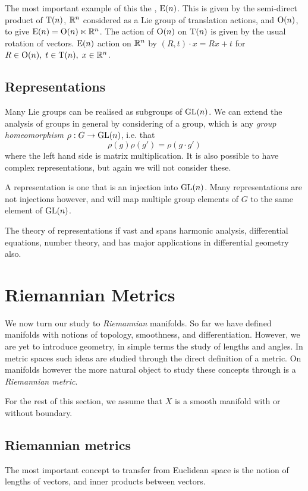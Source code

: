 The most important example of this the , \(\groupE\).
This is given by the semi-direct product of \(\groupT\), \(\R^n\) considered as a Lie group of translation actions, and \(\groupO\), to give \(\groupE = \groupO \ltimes \R^n\).
The action of \(\groupO\) on \(\groupT\) is given by the usual rotation of vectors.
\(\groupE\) action on \(\R^n\) by \((R, t) \cdot x = Rx + t\) for \(R\in\groupO,\;t\in\groupT,\;x\in\R^n\).

\subsection{Representations}
Many Lie groups can be realised as subgroups of \(\groupGL[n]\).
We can extend the analysis of groups in general by considering  of a group, which is any \emph{group homeomorphism} \(\rho: G\to \groupGL[n]\), i.e. that
\[\rho(g)\rho(g') = \rho(g\cdot g')\]
where the left hand side is matrix multiplication.
It is also possible to have complex representations, but again we will not consider these.

A  representation is one that is an injection into \(\groupGL\).
Many representations are not injections however, and will map multiple group elements of \(G\) to the same element of \(\groupGL\).

The theory of representations if vast and spans harmonic analysis, differential equations, number theory, and has major applications in differential geometry also. 

\section{Riemannian Metrics}
\label{sec:riemannian_manifolds}
We now turn our study to \emph{Riemannian} manifolds. 
So far we have defined manifolds with notions of topology, smoothness, and differentiation. 
However, we are yet to introduce geometry, in simple terms the study of lengths and angles.
In metric spaces such ideas are studied through the direct definition of a metric.
On manifolds however the more natural object to study these concepts through is a \emph{Riemannian metric}.

For the rest of this section, we assume that \(X\) is a smooth manifold with or without boundary.

\subsection{Riemannian metrics}
The most important concept to transfer from Euclidean space is the notion of lengths of vectors, and inner products between vectors.

